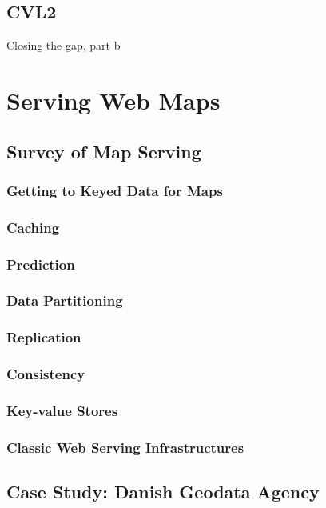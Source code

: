 \documentclass[11pt, oneside]{report}   	%
\begin{document}
\chapter{CVL2} 
Closing the gap, part b

\part{Serving Web Maps}

\chapter{Survey of Map Serving}

\section{Getting to Keyed Data for Maps}

\section{Caching}

\section{Prediction}

\section{Data Partitioning}

\section{Replication}

\section{Consistency}

\section{Key-value Stores}

\section{Classic Web Serving Infrastructures}

\chapter{Case Study: Danish Geodata Agency}
\end{document}
